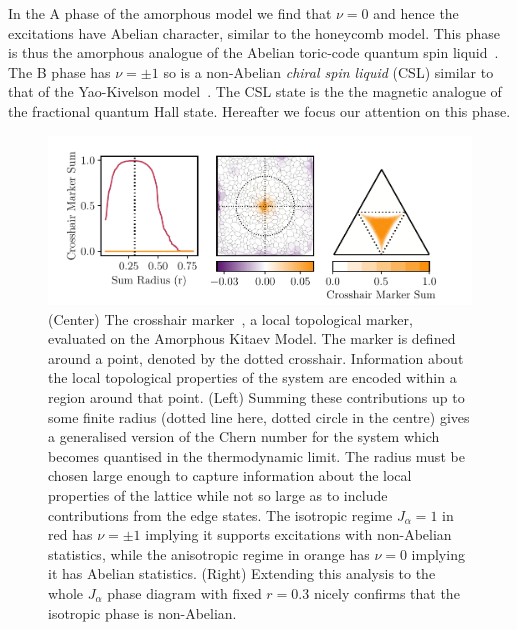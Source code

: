 In the A phase of the amorphous model we find that \(\nu=0\) and hence the excitations have Abelian character, similar to the honeycomb model. This phase is thus the amorphous analogue of the Abelian toric-code quantum spin liquid~\autocite{kitaev_fault-tolerant_2003}. The B phase has \(\nu=\pm1\) so is a non-Abelian \emph{chiral spin liquid} (CSL) similar to that of the Yao-Kivelson model~\autocite{yaoExactChiralSpin2007}. The CSL state is the the magnetic analogue of the fractional quantum Hall state\autocite{laughlinPropertiesChiralspinliquidState1990}. Hereafter we focus our attention on this phase.

\hypertarget{fig:phase_diagram_chern}{%
\begin{figure}
\centering
\includegraphics[width=1\textwidth,height=\textheight]{figure_code/amk_chapter/results/phase_diagram_chern/phase_diagram_chern}
\caption[{Local Chern Markers}]{(Center) The crosshair marker~\autocite{peru_preprint}, a local topological marker, evaluated on the Amorphous Kitaev Model. The marker is defined around a point, denoted by the dotted crosshair. Information about the local topological properties of the system are encoded within a region around that point. (Left) Summing these contributions up to some finite radius (dotted line here, dotted circle in the centre) gives a generalised version of the Chern number for the system which becomes quantised in the thermodynamic limit. The radius must be chosen large enough to capture information about the local properties of the lattice while not so large as to include contributions from the edge states. The isotropic regime \(J_\alpha = 1\) in red has \(\nu = \pm 1\) implying it supports excitations with non-Abelian statistics, while the anisotropic regime in orange has \(\nu = 0\) implying it has Abelian statistics. (Right) Extending this analysis to the whole \(J_\alpha\) phase diagram with fixed \(r = 0.3\) nicely confirms that the isotropic phase is non-Abelian.}
\label{fig:phase_diagram_chern}
\end{figure}
}

